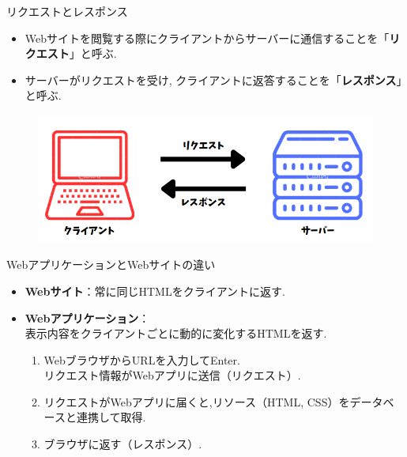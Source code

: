 \documentclass[aspectratio=169]{beamer}
\begin{document}
\begin{frame}{リクエストとレスポンス}
    \begin{itemize}
            \setlength{\parskip}{1.5em}
            \item Webサイトを閲覧する際にクライアントからサーバーに通信することを「\textbf{リクエスト}」と呼ぶ.
            \item サーバーがリクエストを受け, クライアントに返答することを「\textbf{レスポンス}」と呼ぶ.
    \end{itemize}
    \begin{figure}
        \includegraphics[scale=0.4]{server-and-client.png}
    \end{figure}
\end{frame}

\begin{frame}{WebアプリケーションとWebサイトの違い}
    \begin{itemize}
        \setlength{\parskip}{1.5em}
        \item \textbf{Webサイト}：常に同じHTMLをクライアントに返す.
        \item \textbf{Webアプリケーション}：\\表示内容をクライアントごとに動的に変化するHTMLを返す.
        \begin{enumerate}
            \setlength{\parskip}{1em}
            \item WebブラウザからURLを入力してEnter.\\リクエスト情報がWebアプリに送信（リクエスト）.
            \item リクエストがWebアプリに届くと,リソース（HTML, CSS）をデータベースと連携して取得.
            \item ブラウザに返す（レスポンス）.
        \end{enumerate}
    \end{itemize}
\end{frame}
\end{document}
